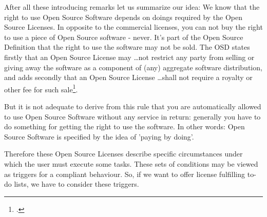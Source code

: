 %
%
%
%
%



After all these introducing remarks let us summarize our idea: We know that the
right to use Open Source Software depends on doings required by the Open Source
Licenses. In opposite to the commercial licenses, you can not buy the right to
use a piece of Open Source software - never. It's part of the Open Source
Definition that the right to use the software may not be sold. The OSD
states firstly that an Open Source License may \glqq{}\ldots not
restrict any party from selling or giving away the software as a component of (any)
aggregate software distribution\grqq{}, and adds secondly that an Open Source
License \glqq{}\ldots shall not require a royalty or other fee for such
sale\grqq{}\footcite[cf.][\nopage wp. §1]{OSI2012a}.

But it is not adequate to derive from this rule that you are automatically
allowed to use Open Source Software without any service in return: generally you
have to do something for getting the right to use the software. In other words:
Open Source Software is specified by the idea of 'paying by doing'.

Therefore these Open Source Licenses describe specific circumstances under
which the user must execute some tasks. These sets of conditions may be viewed
as triggers for a compliant behaviour. So, if we want to offer license fulfilling
to-do lists, we have to consider these triggers. 

